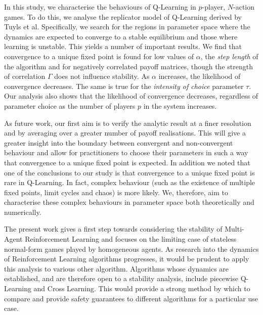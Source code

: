 \documentclass[sigconf]{aamas}
\begin{document}
In this study, we characterise the behaviours of Q-Learning in $p$-player, $N$-action games. To do this, we analyse the replicator model of Q-Learning derived by Tuyls et al. Specifically, we search for the regions in parameter space where the dynamics are expected to converge to a stable equilibrium and those where learning is unstable. This yields a number of important results. We find that convergence to a unique fixed point is found for low values of $\alpha$, the \textit{step length} of the algorithm and for negatively correlated payoff matrices, though the strength of correlation $\Gamma$ does not influence stability. As $\alpha$ increases, the likelihood of convergence decreases. The same is true for the \textit{intensity of choice} parameter $\tau$. Our analysis also shows that the likelihood of convergence decreases, regardless of parameter choice as the number of players $p$ in the system increases.

As future work, our first aim is to verify the analytic result at a finer resolution and by averaging over a greater number of payoff realisations. This will give a greater insight into the boundary between convergent and non-convergent behaviour and allow for practitioners to choose their parameters in such a way that convergence to a unique fixed point is expected. In addition we noted that one of the conclusions to our study is that convergence to a unique fixed point is rare in Q-Learning. In fact, complex behaviour (such as the existence of multiple fixed points, limit cycles and chaos) is more likely. We, therefore, aim to characterise these complex behaviours in parameter space both theoretically and numerically.

The present work gives a first step towards considering the stability of Multi-Agent Reinforcement Learning and focuses on the limiting case of stateless normal-form games played by homogeneous agents. As research into the dynamics of Reinforcement Learning algorithms progresses, it would be prudent to apply this analysis to various other algorithm. Algorithms whose dynamics are established, and are therefore open to a stability analysis, include piecewise Q-Learning and Cross Learning. This would provide a strong method by which to compare and provide safety guarantees to different algorithms for a particular use case. 


\end{document}
